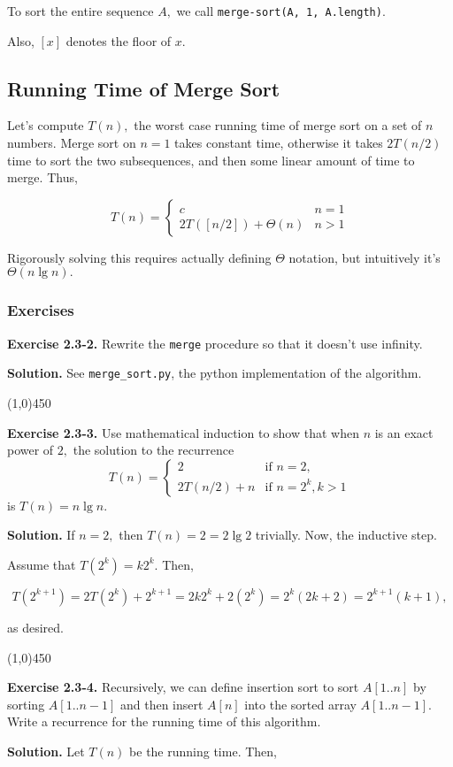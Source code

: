 \documentclass{article}
\newcommand{\exec}[2]
{\textbf{Exercise #1.} #2

\textbf{Solution.}}
\newcommand{\bardiv}{\begin{center}
\line(1,0){450}
\end{center}}
\begin{document}
To sort the entire sequence $A,$ we call \texttt{merge-sort(A, 1, A.length)}.

Also, $[x]$ denotes the floor of $x.$

\subsection{Running Time of Merge Sort}

Let's compute $T(n),$ the worst case running time of merge sort on a set of $n$ numbers. Merge sort on $n=1$ takes constant time, otherwise it takes $2T(n/2)$ time to sort the two subsequences, and then some linear amount of time to merge. Thus,

$$T(n) = \begin{cases}
		c & n=1 \\
		2T([n/2]) + \Theta(n) & n > 1
         \end{cases}$$

Rigorously solving this requires actually defining $\Theta$ notation, but intuitively it's $\Theta(n\lg n).$

\subsubsection{Exercises}

\exec{2.3-2}{Rewrite the \texttt{merge} procedure so that it doesn't use infinity.}
See \texttt{merge\_sort.py}, the python implementation of the algorithm.

\bardiv

\exec{2.3-3}{Use mathematical induction to show that when $n$ is an exact power of $2,$ the solution to the recurrence
	$$T(n) = \begin{cases} 2 & \text{if }n = 2, \\ 2T(n/2) + n & \text{if }n = 2^k, k>1 \end{cases}$$ is $T(n) = n \lg n.$}
If $n = 2,$ then $T(n) = 2 = 2\lg 2$ trivially. Now, the inductive step.

Assume that $T(2^k) = k2^k.$ Then,

$$T(2^{k+1}) = 2T(2^k) + 2^{k+1} = 2k2^k + 2(2^k) = 2^k(2k+2) = 2^{k+1}(k+1),$$

as desired.
\bardiv

\exec{2.3-4}{Recursively, we can define insertion sort to sort $A[1..n]$ by sorting $A[1..n-1]$ and then insert $A[n]$ into the sorted array $A[1..n-1].$ Write a recurrence for the running time of this algorithm.}
Let $T(n)$ be the running time. Then,
\end{document}

